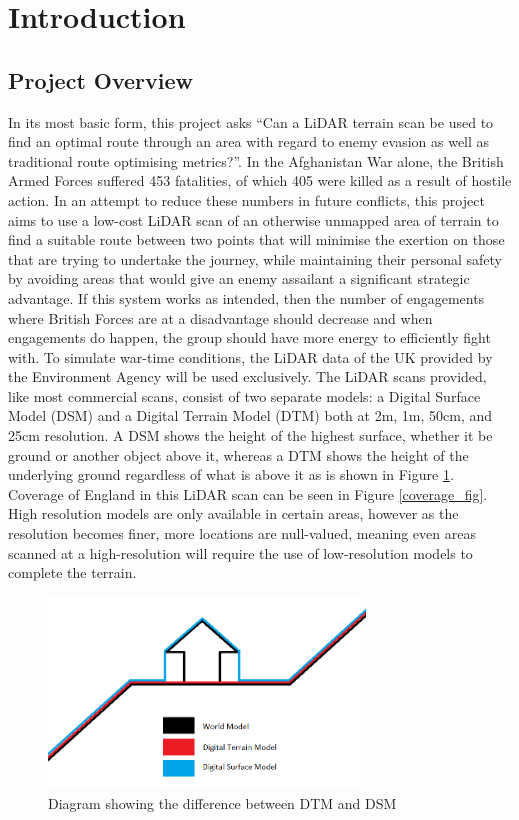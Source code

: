 \documentclass[12pt,a4paper]{article}
\begin{document}
\section{Introduction}

  \subsection{Project Overview}
  \noindent In its most basic form, this project asks ``Can a LiDAR terrain scan be used to find an optimal route through an area with regard to enemy evasion as well as traditional route optimising metrics?''. In the Afghanistan War alone, the British Armed Forces suffered 453 fatalities, \cite{op_herrick_casualties} of which 405 were killed as a result of hostile action. \cite{ops_in_afghan} In an attempt to reduce these numbers in future conflicts, this project aims to use a low-cost LiDAR scan of an otherwise unmapped area of terrain to find a suitable route between two points that will minimise the exertion on those that are trying to undertake the journey, while maintaining their personal safety by avoiding areas that would give an enemy assailant a significant strategic advantage. If this system works as intended, then the number of engagements where British Forces are at a disadvantage should decrease and when engagements do happen, the group should have more energy to efficiently fight with. To simulate war-time conditions, the LiDAR data of the UK provided by the Environment Agency will be used exclusively. \cite{env_lidar_survey} The LiDAR scans provided, like most commercial scans, consist of two separate models: a Digital Surface Model (DSM) and a Digital Terrain Model (DTM) both at 2m, 1m, 50cm, and 25cm resolution. A DSM shows the height of the highest surface, whether it be ground or another object above it, whereas a DTM shows the height of the underlying ground regardless of what is above it as is shown in Figure \ref{dtm_dsm_fig}. Coverage of England in this LiDAR scan can be seen in Figure \ref{coverage_fig}. High resolution models are only available in certain areas, however as the resolution becomes finer, more locations are null-valued, meaning even areas scanned at a high-resolution will require the use of low-resolution models to complete the terrain.

  \begin{figure}[h]
    \centering
    \includegraphics[width=0.75\textwidth]{dtm_dsm_diagram}
    \caption{Diagram showing the difference between DTM and DSM}
    \label{dtm_dsm_fig}
  \end{figure}
\end{document}
